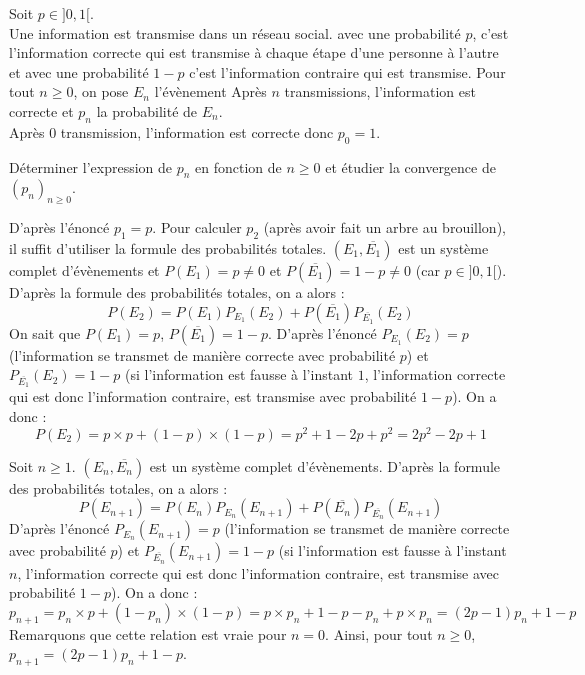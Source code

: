 \documentclass[a4paper,10pt]{report}
\begin{document}
\begin{Exercice}{} Soit $p \in ]0,1[$. \\
Une information est transmise dans un réseau social. avec une probabilité $p$, c'est l'information correcte qui est transmise à chaque étape d'une personne à l'autre et avec une probabilité $1-p$ c'est l'information contraire qui est transmise. Pour tout $n \geq 0$, on pose $E_n$ l'évènement \og Après $n$ transmissions, l'information est correcte \fg et $p_n$ la probabilité de $E_n$. \\
\noindent Après 0 transmission, l'information est correcte donc $p_0=1$.

\medskip Déterminer l'expression de $p_n$ en fonction de $n \geq 0$ et étudier la convergence de $(p_n)_{n \geq 0}$.
\end{Exercice}

\corr D'après l'énoncé $p_1=p$. Pour calculer $p_2$ (après avoir fait un arbre au brouillon), il suffit d'utiliser la formule des probabilités totales. $(E_1, \overline{E_1})$ est un système complet d'évènements et $P(E_1)=p \neq 0$ et $P(\overline{E_1})=1-p \neq 0$ (car $p \in ]0,1[$). D'après la formule des probabilités totales, on a alors :
\[ P(E_2)=P(E_1)P_{E_1}(E_2) + P( \overline{E_1}) P_{\overline{E_1}}(E_2) \]
On sait que $P(E_1)=p$, $P(\overline{E_1})=1-p$. D'après l'énoncé $P_{E_1}(E_2)=p$ (l'information se transmet de manière correcte avec probabilité $p$) et $P_{\overline{E_1}}(E_2)=1-p$ (si l'information est fausse à l'instant $1$, l'information correcte qui est donc l'information contraire, est transmise avec probabilité $1-p$). On a donc :
\[ P(E_2)= p\times p + (1-p)\times (1-p) = p^2 + 1 -2p+p^2 = 2p^2-2p+1\]

\medskip

\noindent Soit $n \geq 1$. $(E_n, \overline{E_n})$ est un système complet d'évènements. D'après la formule des probabilités totales, on a alors :
\[ P(E_{n+1})=P(E_n)P_{E_n}(E_{n+1}) + P( \overline{E_n}) P_{\overline{E_n}}(E_{n+1}) \]
D'après l'énoncé $P_{E_n}(E_{n+1})=p$ (l'information se transmet de manière correcte avec probabilité $p$) et $P_{\overline{E_n}}(E_{n+1})=1-p$ (si l'information est fausse à l'instant $n$, l'information correcte qui est donc l'information contraire, est transmise avec probabilité $1-p$). On a donc :
\[ p_{n+1} = p_n \times p + (1-p_n)\times (1-p) = p \times p_n + 1 -p -p_n+ p \times p_n = (2p-1)p_n + 1-p \]
Remarquons que cette relation est vraie pour $n=0$. Ainsi, pour tout $n \geq 0$, $p_{n+1}=(2p-1)p_n+1-p$.
\end{document}
